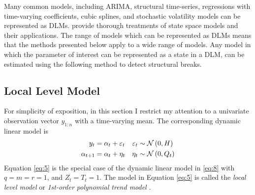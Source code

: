 \documentclass{article}
\begin{document}
Many common models, including ARIMA, structural time-series, regressions with time-varying coefficients, cubic splines, and stochastic volatility models can be represented as DLMs. 
\textcites{WestHarrison1997}{DurbinKoopman2001}{CommandeurKoopman2007}{PetrisPetroneEtAl2009}{ShumwayStoffer2010} provide thorough treatments of state space models and their applications.
The range of models which can be represented as DLMs means that the methods presented below apply to a wide range of models.
Any model in which the parameter of interest can be represented as a state in a DLM, can be estimated using the following method to detect structural breaks.

\subsection{Local Level Model}
\label{sec:local-level-model}

For simplicity of exposition, in this section I restrict my attention to a univariate observation vector $y_{1:n}$ with a time-varying mean.
The corresponding dynamic linear model is
\begin{equation}
  \label{eq:5}
  \begin{aligned}[t]
    y_{t} &= \alpha_{t} + \varepsilon_{t} & \varepsilon_{t} & \sim \mathcal{N}\left(0, H\right) \\
    \alpha_{t + 1} &= \alpha_{t} + \eta_{t} & \eta_{t} & \sim \mathcal{N}\left(0, Q_{t}\right)
  \end{aligned}
\end{equation}
Equation \eqref{eq:5} is the special case of the dynamic linear model in \eqref{eq:8} with $q = m = r = 1$, and $Z_{t} = T_{t} = 1$.
The model in Equation \eqref{eq:5} is called the \textit{local level model} \parencites[Chapter 2][]{DurbinKoopman2001} or \textit{1st-order polynomial trend model} \parencite[Chapter 2]{WestHarrison1997}.
\end{document}
